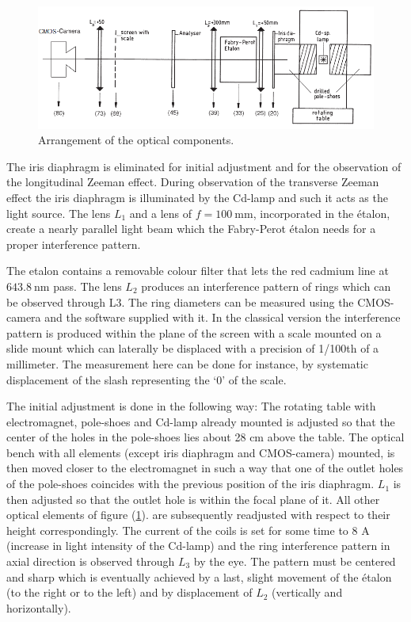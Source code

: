 \documentclass[%
 reprint,
nofootinbib,
 amsmath,amssymb,
 aps,
floatfix,
]{revtex4-2}
\begin{document}
    \begin{figure}
        \centering
        \includegraphics{Figures/optical arrangement.png}
        \caption{Arrangement of the optical components.}
        \label{fig:optical}
    \end{figure}
    The iris diaphragm is eliminated for initial adjustment and for the observation of the longitudinal Zeeman effect. During observation of the transverse Zeeman effect the iris diaphragm is illuminated by the Cd-lamp and such it acts as the light source. The lens $L_1$ and a lens of $f = \SI{100}{\milli \metre}$, incorporated in the étalon, create a nearly parallel light beam which the Fabry-Perot étalon needs for a proper interference pattern.
    \par
    The etalon contains a removable colour filter that lets the red cadmium line at $\SI{643.8}{\nano \metre}$ pass. The lens $L_2$ produces an interference pattern of rings which can be observed through L3. The ring diameters can be measured using the CMOS-camera and the software supplied with it. In the classical version the interference pattern is produced within the plane of the screen with a scale mounted on a slide mount which can laterally be displaced with a precision of 1/100th of a millimeter. The measurement here can be done for instance, by systematic displacement of the slash representing the `0' of the scale.
    \par
    The initial adjustment is done in the following way: The rotating table with electromagnet, pole-shoes and Cd-lamp already mounted is adjusted so that the center of the holes in the pole-shoes lies about 28 cm above the table. The optical bench with all elements (except iris diaphragm and CMOS-camera) mounted, is then moved closer to the electromagnet in such a way that one of the outlet holes of the pole-shoes coincides with the previous position of the iris diaphragm. $L_1$ is then adjusted so that the outlet hole is within the focal plane of it. All other optical elements of figure (\ref{fig:optical}). are subsequently readjusted with respect to their height correspondingly. The current of the coils is set for some time to 8 A (increase in light intensity of the Cd-lamp) and the ring interference pattern in axial direction is observed through $L_3$ by the eye. The pattern must be centered and sharp which is eventually achieved by a last, slight movement of the étalon (to the right or to the left) and by displacement of $L_2$ (vertically and horizontally).
\end{document}
